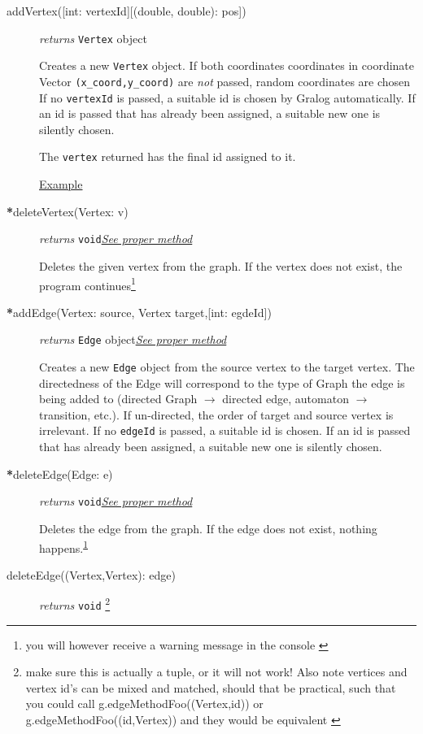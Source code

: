 \documentclass{article}
\newlength\q
\begin{document}
\begin{description}
\item[addVertex({[int: vertexId]}{[(double, double): pos]})]\emph{returns}
  \texttt{Vertex} object

  Creates a new \texttt{Vertex} object. If both coordinates coordinates in coordinate Vector \texttt{(x\_coord,y\_coord)} are \textit{not} passed,
  random coordinates are chosen
  If no \texttt{vertexId} is passed, a suitable id is
  chosen by Gralog automatically. If an id is passed that has already
  been assigned, a suitable new one is silently chosen.
  
  The \texttt{vertex} returned has the final id assigned to it.
  
  \hyperref[addVertexExample]{Example}

  
\item[\textbf{*}deleteVertex(Vertex: v)] \emph{returns} \texttt{void}\quad \hyperref[deleteVertexClass]{\textit{See proper method}}

Deletes the given vertex from the graph. If the vertex does not exist, the program continues\footnote{you will however receive a warning message in the console \label{deleteVertexWarning}}


\item[\textbf{*}addEdge(Vertex: source, Vertex target,{[int: egdeId]})] \emph{returns} \texttt{Edge} object\quad \hyperref[addEdgeClass]{\textit{See proper method}}


Creates a new \texttt{Edge} object from the source vertex to the
target vertex. The directedness of the Edge will correspond to the type of Graph the edge is being added to (directed Graph $\to$ directed edge, automaton $\to$ transition, etc.). If un-directed, the
order of target and source vertex is irrelevant. If no \texttt{edgeId}
is passed, a suitable id is chosen. If an id is passed that has
already been assigned, a suitable new one is silently chosen.


\item[\textbf{*}deleteEdge(Edge: e)] \emph{returns} \texttt{void}\quad \hyperref[deleteEdgeClass]{\textit{See proper method}}

Deletes the edge from the graph. If the edge does not exist, nothing
happens.\textsuperscript{\ref{deleteVertexWarning}}


\item[deleteEdge((Vertex,Vertex): edge)] \emph{returns} \texttt{void} \footnote{make sure this is actually a tuple, or it will not work! Also note vertices and vertex id's can be mixed and matched, should that be practical, such that you could call g.edgeMethodFoo((Vertex,id)) or g.edgeMethodFoo((id,Vertex)) and they would be equivalent \label{makeSureATupleWarning1}}


\end{description}
\end{document}
